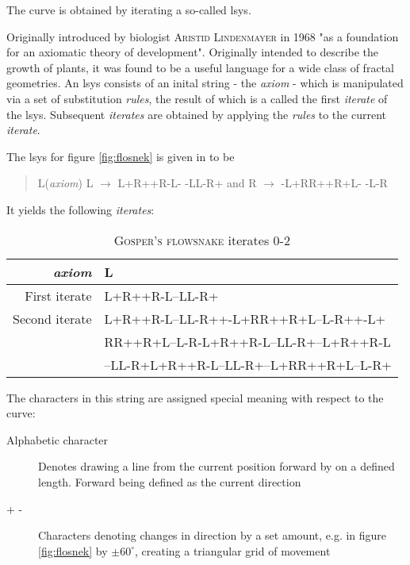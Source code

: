 The curve is obtained by iterating a so-called \gls{lsys}.

Originally introduced by biologist \textsc{Aristid Lindenmayer} in 1968 "as a foundation for an axiomatic theory of development"\citep[Preface]{Prusinkiewicz2013}. Originally intended to describe the growth of plants, it was found to be a useful language for a wide class of fractal geometries.
An \gls{lsys} consists of an inital string - the \textit{\gls{axiom}} - which is manipulated via a set of substitution \textit{rules}, the result of which is a called the first \textit{iterate} of the \gls{lsys}. Subsequent \textit{iterates} are obtained by applying the \textit{rules} to the current \textit{iterate}.

The \gls{lsys} for figure \ref{fig:flosnek} is given in \citet[p.7]{Arndt2016} to be 
\begin{quote}
	\centering
	L(\textit{axiom}) \quad L $\rightarrow$ L+R++R-L- -LL-R+ \quad and \quad R $\rightarrow$ -L+RR++R+L- -L-R
\end{quote}

It yields the following \textit{iterates}:\\
\begin{table}[htb]
\begin{tabular}{r|l}\hline
\textit{\gls{axiom}}& L\\\hline
First iterate 	& L+R++R-L--LL-R+\\\hline
Second iterate 	& L+R++R-L--LL-R++-L+RR++R+L--L-R++-L+\\
		& RR++R+L--L-R-L+R++R-L--LL-R+--L+R++R-L\\
		& --LL-R+L+R++R-L--LL-R+--L+RR++R+L--L-R+\\\hline
\end{tabular}
\caption{\textsc{Gosper's flowsnake} iterates 0-2}
\label{desc:lsysit}
\end{table}

The characters in this string are assigned special meaning with respect to the curve:
\begin{description}
	\item[Alphabetic character] Denotes drawing a line from the current position forward by on a defined length. Forward being defined as the current direction
	\item[+ -] Characters denoting changes in direction by a set amount, e.g. in figure \ref{fig:flosnek} by $\pm60^\circ$, creating a triangular grid of movement
\end{description}

